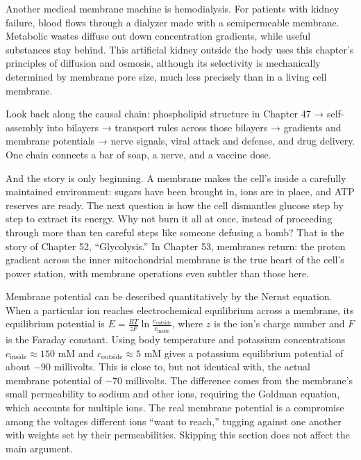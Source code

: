 Another medical membrane machine is hemodialysis. For patients with kidney failure, blood flows through a dialyzer made with a semipermeable membrane. Metabolic wastes diffuse out down concentration gradients, while useful substances stay behind. This artificial kidney outside the body uses this chapter's principles of diffusion and osmosis, although its selectivity is mechanically determined by membrane pore size, much less precisely than in a living cell membrane.

Look back along the causal chain: phospholipid structure in Chapter 47 → self-assembly into bilayers → transport rules across those bilayers → gradients and membrane potentials → nerve signals, viral attack and defense, and drug delivery. One chain connects a bar of soap, a nerve, and a vaccine dose.

And the story is only beginning. A membrane makes the cell's inside a carefully maintained environment: sugars have been brought in, ions are in place, and ATP reserves are ready. The next question is how the cell dismantles glucose step by step to extract its energy. Why not burn it all at once, instead of proceeding through more than ten careful steps like someone defusing a bomb? That is the story of Chapter 52, ``Glycolysis.'' In Chapter 53, membranes return: the proton gradient across the inner mitochondrial membrane is the true heart of the cell's power station, with membrane operations even subtler than those here.

\begin{tiaozhan}
Membrane potential can be described quantitatively by the Nernst equation. When a particular ion reaches electrochemical equilibrium across a membrane, its equilibrium potential is $E = \frac{RT}{zF}\ln\frac{c_{\text{outside}}}{c_{\text{inside}}}$, where $z$ is the ion's charge number and $F$ is the Faraday constant. Using body temperature and potassium concentrations $c_{\text{inside}}\approx 150$ mM and $c_{\text{outside}}\approx 5$ mM gives a potassium equilibrium potential of about $-90$ millivolts. This is close to, but not identical with, the actual membrane potential of $-70$ millivolts. The difference comes from the membrane's small permeability to sodium and other ions, requiring the Goldman equation, which accounts for multiple ions. The real membrane potential is a compromise among the voltages different ions ``want to reach,'' tugging against one another with weights set by their permeabilities. Skipping this section does not affect the main argument.
\end{tiaozhan}

